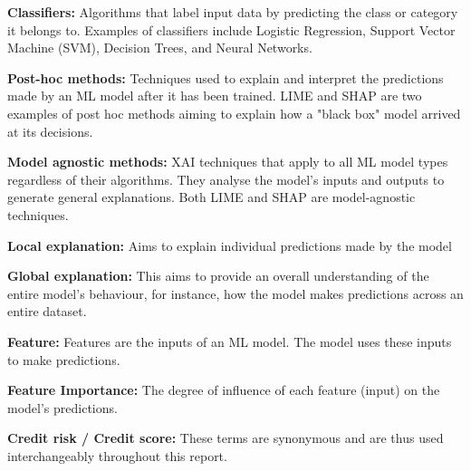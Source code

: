 \documentclass[12pt,a4paper]{article}
\begin{document}
\textbf{Classifiers:} Algorithms that label input data by predicting the class or category it belongs to. Examples of classifiers include Logistic Regression, Support Vector Machine (SVM), Decision Trees, and Neural Networks.

\textbf{Post-hoc methods:} Techniques used to explain and interpret the predictions made by an ML model after it has been trained. LIME and SHAP are two examples of post hoc methods aiming to explain how a "black box" model arrived at its decisions.

\textbf{Model agnostic methods:} XAI techniques that apply to all ML model types regardless of their algorithms. They analyse the model's inputs and outputs to generate general explanations. Both LIME and SHAP are model-agnostic techniques.

\textbf{Local explanation:} Aims to explain individual predictions made by the model

\textbf{Global explanation:} This aims to provide an overall understanding of the entire model’s behaviour, for instance, how the model makes predictions across an entire dataset.

\textbf{Feature:} Features are the inputs of an ML model. The model uses these inputs to make predictions. 

\textbf{Feature Importance:} The degree of influence of each feature (input) on the model's predictions. 

\textbf{Credit risk / Credit score:} These terms are synonymous and are thus used interchangeably throughout this report.
\endgroup

\newpage
\end{document}

